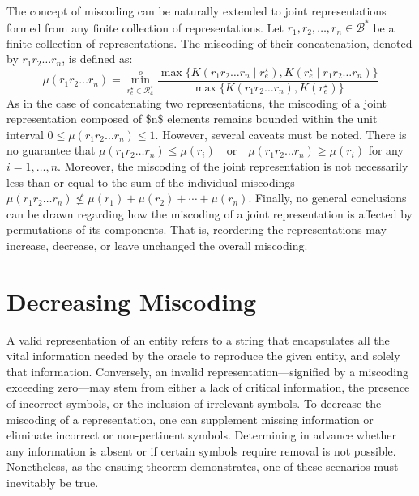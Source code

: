 The concept of miscoding can be naturally extended to joint representations formed from any finite collection of representations. Let $r_1, r_2, \ldots, r_n \in \mathcal{B}^\ast$ be a finite collection of representations. The miscoding of their concatenation, denoted by $r_1 r_2 \ldots r_n$, is defined as:
\[
\mu(r_1 r_2 \ldots r_n) = \overset{o}{ \underset{ r^\star_e \in \mathcal{R}^\star_\mathcal{E} } \min} \frac{ \max\{ K \left( r_1 r_2 \ldots r_n \mid r^\star_e \right), K \left( r^\star_e \mid r_1 r_2 \ldots r_n \right) \} } { \max\{ K \left( r_1 r_2 \ldots r_n \right), K \left( r^\star_e \right) \} }
\]
As in the case of concatenating two representations, the miscoding of a joint representation composed of \$n\$ elements remains bounded within the unit interval $0 \leq \mu(r_1 r_2 \ldots r_n) \leq 1$. However, several caveats must be noted. There is no guarantee that $\mu(r_1 r_2 \ldots r_n) \leq \mu(r_i) \quad \text{or} \quad \mu(r_1 r_2 \ldots r_n) \geq \mu(r_i)$ for any $i = 1, \ldots, n$. Moreover, the miscoding of the joint representation is not necessarily less than or equal to the sum of the individual miscodings $\mu(r_1 r_2 \ldots r_n) \nleq \mu(r_1) + \mu(r_2) + \cdots + \mu(r_n)$. Finally, no general conclusions can be drawn regarding how the miscoding of a joint representation is affected by permutations of its components. That is, reordering the representations may increase, decrease, or leave unchanged the overall miscoding.

%
%

\section{Decreasing Miscoding}

A valid representation of an entity refers to a string that encapsulates all the vital information needed by the oracle to reproduce the given entity, and solely that information. Conversely, an invalid representation—signified by a miscoding exceeding zero—may stem from either a lack of critical information, the presence of incorrect symbols, or the inclusion of irrelevant symbols. To decrease the miscoding of a representation, one can supplement missing information or eliminate incorrect or non-pertinent symbols. Determining in advance whether any information is absent or if certain symbols require removal is not possible. Nonetheless, as the ensuing theorem demonstrates, one of these scenarios must inevitably be true.

